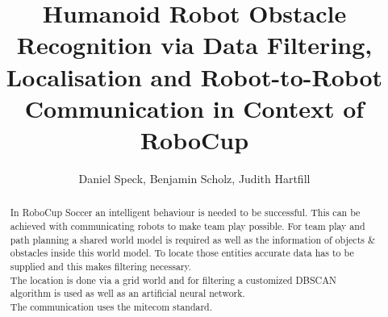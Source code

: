 \documentclass[lnicst,a4paper]{svmultln}
\begin{document}
%
\mainmatter              %
%
\title{Humanoid Robot Obstacle Recognition via Data Filtering, Localisation and Robot-to-Robot Communication in Context of RoboCup} 
%
%
\author{Daniel Speck, Benjamin Scholz, Judith Hartfill}
%
%
\tocauthor{}
%

\maketitle              %





\begin{abstract}        %
In RoboCup Soccer an intelligent behaviour is needed to be successful. This can be achieved with communicating robots to make team play possible. For team play and path planning a shared world model is required as well as the information of objects \& obstacles inside this world model. To locate those entities accurate data has to be supplied and this makes filtering necessary.
\\
The location is done via a grid world and for filtering a customized DBSCAN algorithm is used as well as an artificial neural network.
\\
The communication uses the mitecom standard.

\end{abstract}
%
\end{document}

